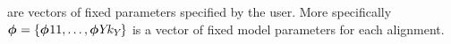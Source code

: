 \documentclass[letterpaper,12pt]{article}
\begin{document}
\begin{linenumbers}
\begin{linenomath}
are vectors of fixed parameters specified by the user.
More specifically $\hkyModelVector = \taxonLocusVector{\hkyModelVector}$ is a
vector of fixed \hky model parameters for each alignment.
\end{linenomath}


\end{linenumbers}
\end{document}
